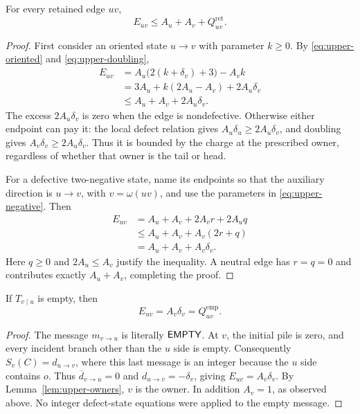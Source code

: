 \begin{lemma}\label{lem:upper-retained-charge}
For every retained edge $uv$,
\[
 E_{uv}\leq A_u+A_v+Q_{uv}^{\mathrm{ret}}.
\]
\end{lemma}

\begin{proof}
First consider an oriented state $u\to v$ with parameter $k\geq0$.
By \eqref{eq:upper-oriented} and \eqref{eq:upper-doubling},
\begin{align*}
 E_{uv}
 &=A_u\bigl(2(k+\delta_v)+3\bigr)-A_vk\\
 &=3A_u+k(2A_u-A_v)+2A_u\delta_v\\
 &\leq A_u+A_v+2A_u\delta_v.
\end{align*}
The excess $2A_u\delta_v$ is zero when the edge is nondefective.
Otherwise either endpoint can pay it: the local defect relation gives
$A_u\delta_u\geq2A_u\delta_v$, and doubling gives
$A_v\delta_v\geq2A_u\delta_v$.  Thus it is bounded by the charge at
the prescribed owner, regardless of whether that owner is the tail or head.

For a defective two-negative state, name its endpoints so that the auxiliary
direction is $u\to v$, with $v=\omega(uv)$, and use the parameters
in \eqref{eq:upper-negative}.  Then
\begin{align*}
 E_{uv}
 &=A_u+A_v+2A_vr+2A_uq\\
 &\leq A_u+A_v+A_v(2r+q)\\
 &=A_u+A_v+A_v\delta_v.
\end{align*}
Here $q\geq0$ and $2A_u\leq A_v$ justify the inequality.  A neutral
edge has $r=q=0$ and contributes exactly $A_u+A_v$, completing the proof.
\end{proof}

\begin{lemma}\label{lem:upper-empty-charge}
If $T_{v\mid u}$ is empty, then
\[
 E_{uv}=A_v\delta_v=Q_{uv}^{\mathrm{emp}}.
\]
\end{lemma}

\begin{proof}
The message $m_{v\to u}$ is literally $\mathsf{EMPTY}$.  At $v$,
the initial pile is zero, and every incident branch other than the $u$ side
is empty.  Consequently
$S_v(C)=d_{u\to v}$, where this last message is an integer because the
$u$ side contains $o$.  Thus
$\overline d_{v\to u}=0$ and $d_{u\to v}=-\delta_v$, giving
$E_{uv}=A_v\delta_v$.  By Lemma~\ref{lem:upper-owners}, $v$ is the
owner.  In addition $A_v=1$, as observed above.  No integer defect-state
equations were applied to the empty message.
\end{proof}

